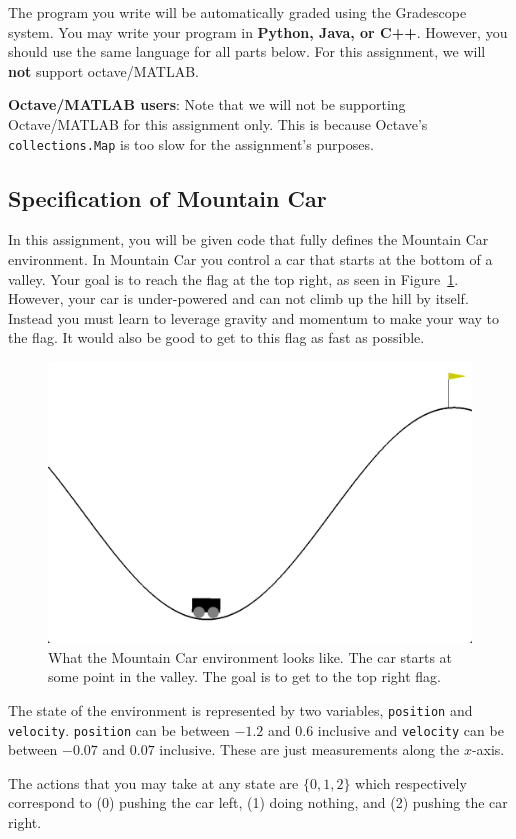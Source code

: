 \documentclass[11pt]{article}
\numberwithin{equation}{section} %
\numberwithin{figure}{section} %
\numberwithin{table}{section} %
\begin{document}
The program you write will be automatically graded using the Gradescope system. You may write your program in \textbf{Python, Java, or C++}. However, you should use the same language for all parts below. For this assignment, we will \textbf{not} support octave/MATLAB.

\textbf{Octave/MATLAB users}: Note that we will not be supporting Octave/MATLAB for this assignment only. This is because Octave's \texttt{collections.Map} is too slow for the assignment's purposes.

\subsection{Specification of Mountain Car}
In this assignment, you will be given code that fully defines the Mountain Car environment. In Mountain Car you control a car that starts at the bottom of a valley. Your goal is to reach the flag at the top right, as seen in Figure~\ref{fig:mountaincar}. However, your car is under-powered and can not climb up the hill by itself. Instead you must learn to leverage gravity and momentum to make your way to the flag. It would also be good to get to this flag as fast as possible.

\begin{figure}[H]
    \centering
    \includegraphics[width=0.5\linewidth]{figs/MountainCar.png}
    \caption{What the Mountain Car environment looks like. The car starts at some point in the valley. The goal is to get to the top right flag.}
    \label{fig:mountaincar}
\end{figure}

The state of the environment is represented by two variables, \texttt{position} and \texttt{velocity}. \texttt{position} can be between $-1.2$ and $0.6$ inclusive and \texttt{velocity} can be between $-0.07$ and $0.07$ inclusive. These are just measurements along the $x$-axis.

The actions that you may take at any state are $\{0, 1, 2\}$ which respectively correspond to (0) pushing the car left, (1) doing nothing, and (2) pushing the car right.
\end{document}
